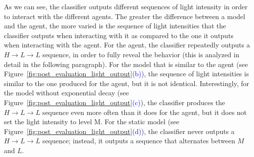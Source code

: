 As we can see, the classifier outputs different sequences of light intensity in order to interact with the different agents. The greater the difference between a model and the agent, the more varied is the sequence of light intensities that the classifier outputs when interacting with it as compared to the one it outputs when interacting with the agent. For the agent, the classifier repeatedly outputs a $H\rightarrow L\rightarrow L$ sequence, in order to fully reveal the behavior (this is analyzed in detail in the following paragraph). For the model that is similar to the agent (see Figure~\ref{fig:post_evaluation_light_output}\textcolor{blue}{(b)}), the sequence of light intensities is similar to the one produced for the agent, but it is not identical. Interestingly, for the model without exponential decay (see Figure~\ref{fig:post_evaluation_light_output}\textcolor{blue}{(c)}), the classifier produces the $H\rightarrow L\rightarrow L$ sequence even more often than it does for the agent, but it does not set the light intensity to level M. For the static model (see Figure~\ref{fig:post_evaluation_light_output}\textcolor{blue}{(d)}), the classifier never outputs a $H\rightarrow L\rightarrow L$ sequence; instead, it outputs a sequence that alternates between $M$ and $L$.

